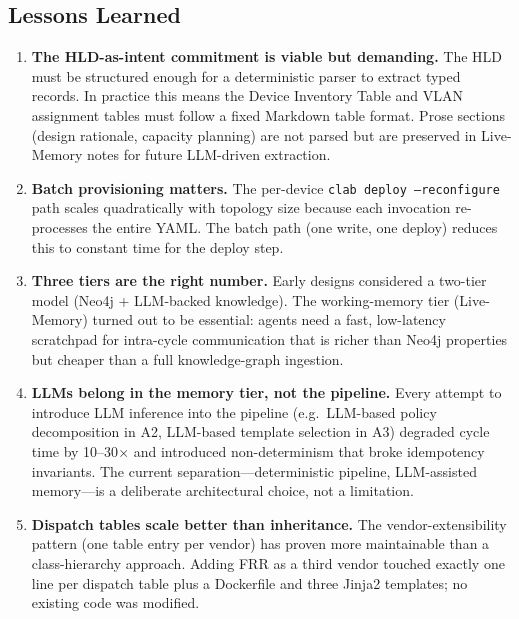 \documentclass[acmtog]{acmart}
\renewcommand\_{\textunderscore\allowbreak}
\begin{document}
\subsection{Lessons Learned}

\begin{enumerate}
  \item \textbf{The HLD-as-intent commitment is viable but
    demanding.} The HLD must be structured enough for a
    deterministic parser to extract typed records. In practice
    this means the Device Inventory Table and VLAN assignment
    tables must follow a fixed Markdown table format. Prose
    sections (design rationale, capacity planning) are not parsed
    but are preserved in Live-Memory notes for future LLM-driven
    extraction.

  \item \textbf{Batch provisioning matters.} The per-device
    \texttt{clab deploy --reconfigure} path scales quadratically
    with topology size because each invocation re-processes the
    entire YAML. The batch path (one write, one deploy) reduces
    this to constant time for the deploy step.

  \item \textbf{Three tiers are the right number.} Early designs
    considered a two-tier model (Neo4j + LLM-backed knowledge).
    The working-memory tier (Live-Memory) turned out to be
    essential: agents need a fast, low-latency scratchpad for
    intra-cycle communication that is richer than Neo4j properties
    but cheaper than a full knowledge-graph ingestion.

  \item \textbf{LLMs belong in the memory tier, not the pipeline.}
    Every attempt to introduce LLM inference into the pipeline
    (e.g.\ LLM-based policy decomposition in A2, LLM-based
    template selection in A3) degraded cycle time by 10--30$\times$
    and introduced non-determinism that broke idempotency
    invariants. The current separation---deterministic pipeline,
    LLM-assisted memory---is a deliberate architectural choice,
    not a limitation.

  \item \textbf{Dispatch tables scale better than inheritance.}
    The vendor-extensibility pattern (one table entry per vendor)
    has proven more maintainable than a class-hierarchy approach.
    Adding FRR as a third vendor touched exactly one line per
    dispatch table plus a Dockerfile and three Jinja2 templates;
    no existing code was modified.
\end{enumerate}
\end{document}

